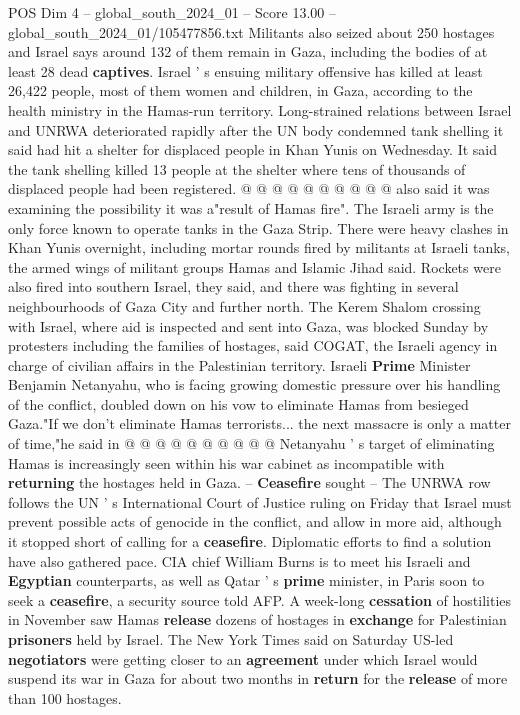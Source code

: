 \begin{textsample}{POS Dim 4 – global\_south\_2024\_01 – Score 13.00 – global\_south\_2024\_01/105477856.txt}
Militants also seized about 250 hostages and Israel says around 132 of them remain in Gaza, including the bodies of at least 28 dead \textbf{captives}.
Israel ' s ensuing military offensive has killed at least 26,422 people, most of them women and children, in Gaza, according to the health ministry in the Hamas-run territory.
Long-strained relations between Israel and UNRWA deteriorated rapidly after the UN body condemned tank shelling it said had hit a shelter for displaced people in Khan Yunis on Wednesday.
It said the tank shelling killed 13 people at the shelter where tens of thousands of displaced people had been registered. @ @ @ @ @ @ @ @ @ @ also said it was examining the possibility it was a"result of Hamas fire".
The Israeli army is the only force known to operate tanks in the Gaza Strip.
There were heavy clashes in Khan Yunis overnight, including mortar rounds fired by militants at Israeli tanks, the armed wings of militant groups Hamas and Islamic Jihad said.
Rockets were also fired into southern Israel, they said, and there was fighting in several neighbourhoods of Gaza City and further north.
The Kerem Shalom crossing with Israel, where aid is inspected and sent into Gaza, was blocked Sunday by protesters including the families of hostages, said COGAT, the Israeli agency in charge of civilian affairs in the Palestinian territory.
Israeli \textbf{Prime} Minister Benjamin Netanyahu, who is facing growing domestic pressure over his handling of the conflict, doubled down on his vow to eliminate Hamas from besieged Gaza."If we don't eliminate Hamas terrorists... the next massacre is only a matter of time,"he said in @ @ @ @ @ @ @ @ @ @ Netanyahu ' s target of eliminating Hamas is increasingly seen within his war cabinet as incompatible with \textbf{returning} the hostages held in Gaza. -- \textbf{Ceasefire} sought -- The UNRWA row follows the UN ' s International Court of Justice ruling on Friday that Israel must prevent possible acts of genocide in the conflict, and allow in more aid, although it stopped short of calling for a \textbf{ceasefire}.
Diplomatic efforts to find a solution have also gathered pace.
CIA chief William Burns is to meet his Israeli and \textbf{Egyptian} counterparts, as well as Qatar ' s \textbf{prime} minister, in Paris soon to seek a \textbf{ceasefire}, a security source told AFP.
A week-long \textbf{cessation} of hostilities in November saw Hamas \textbf{release} dozens of hostages in \textbf{exchange} for Palestinian \textbf{prisoners} held by Israel.
The New York Times said on Saturday US-led \textbf{negotiators} were getting closer to an \textbf{agreement} under which Israel would suspend its war in Gaza for about two months in \textbf{return} for the \textbf{release} of more than 100 hostages.

\end{textsample}
